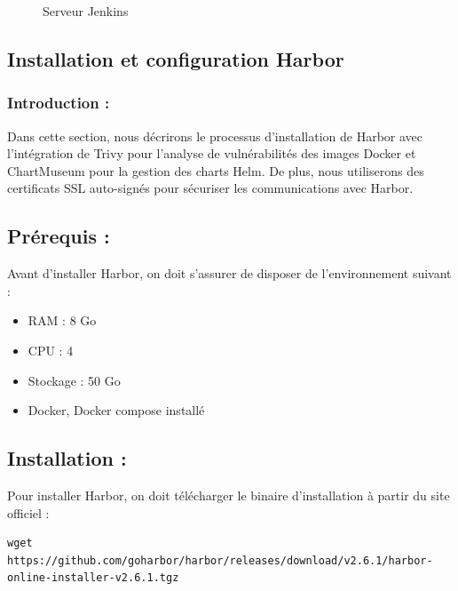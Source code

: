 \begin{figure}[h]
\centering
\caption{Serveur Jenkins}
\end{figure}

\subsection*{Installation et configuration Harbor}

\subsubsection*{Introduction :}

Dans cette section, nous décrirons le processus d’installation de Harbor avec l’intégration de Trivy pour l’analyse de vulnérabilités des images Docker et ChartMuseum pour la gestion des charts Helm. De plus, nous utiliserons des certificats SSL auto-signés pour sécuriser les communications avec Harbor.
\subsection*{Prérequis :}

Avant d’installer Harbor, on doit s’assurer de disposer de l’environnement suivant :

\begin{itemize}
\item RAM : 8 Go
\item CPU : 4
\item Stockage : 50 Go
\item Docker, Docker compose installé
\end{itemize}

\subsection*{Installation :}

Pour installer Harbor, on doit télécharger le binaire d’installation à partir du site officiel :

\begin{verbatim}
wget https://github.com/goharbor/harbor/releases/download/v2.6.1/harbor-online-installer-v2.6.1.tgz
\end{verbatim}

